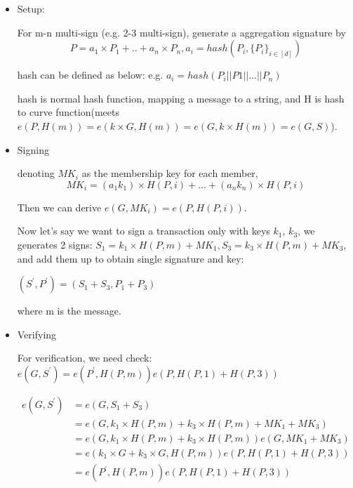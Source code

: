 \documentclass[a4paper,11pt]{article}
\begin{document}
\begin{itemize}

\item Setup: 

For m-n multi-sign (e.g. 2-3 multi-sign),  generate a aggregation signature by 
\begin{equation}
P = a_1\times P_1 + .. + a_n\times P_n, a_i = hash(P_i, \{P_i\}_{i \in [d]})
\end{equation}

hash can be defined as below:
e.g. $a_i = hash(P_i || P1 || ... || P_n)$

hash is normal hash function, mapping a message to a string, and H is hash to curve function(meets $e(P, H(m)) = e(k×G, H(m)) = e(G, k×H(m)) = e(G, S)$). 

\item Signing

denoting $MK_i$ as the membership key for each member,
\begin{equation}
MK_i = (a_1  k_1) \times H(P, i) + ... +  (a_n  k_n) \times H(P, i)
\end{equation}

Then we can derive $ e(G, MK_i) = e(P, H(P, i))$.

Now let's say we want to sign a transaction only with keys $k_1$, $k_3$, we generates 2 signs:  $S_1 = k_1 \times H(P,m) + MK_1,  S_3 = k_3 \times H(P,m) + MK_3$, and add them up to obtain single signature and key:

$(S^{'}, P^{'}) = (S_1+S_3,  P_1 + P_3)$

where m is the message. 

\item Verifying

For verification, we need check:  $e(G, S^{'}) = e(P^{'}, H(P, m)) e(P, H(P, 1) + H(P, 3))$

\begin{displaymath}
\begin{split}
e(G, S^{'}) &= e(G, S_1 + S_3)  \\
&= e(G, k_1 \times H(P, m) + k_3 \times H(P, m) + MK_1 + MK_3)  \\
&= e(G, k_1 \times H(P, m) + k_3 \times H(P, m)) e(G, MK_1 + MK_3) \\
&= e(k_1 \times G + k_3 \times G, H(P, m)) e(P, H(P, 1) + H(P, 3)) \\
&= e(P^{'}, H(P, m)) e(P, H(P, 1) + H(P, 3))
\end{split}
\end{displaymath}


\end{itemize}




\end{document}

